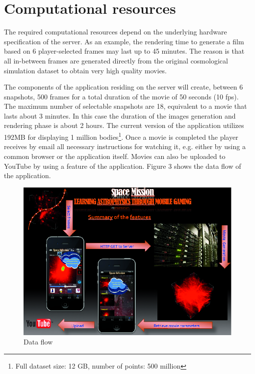 \documentclass[11pt,twoside]{article}
\begin{document}
\section{Computational resources}
The required computational resources depend on the underlying hardware specification of the server. As an example, the rendering time to generate a film based on 6 player-selected frames may last up to 45 minutes. The reason is that all in-between frames are generated directly from the original cosmological simulation dataset to obtain very high quality movies.\par
The components of the application residing on the server will  create, between  6 snapshots,
500 frames for a total duration of the movie of 50 seconds  (10 fps).
The maximum number of selectable snapshots are 18, equivalent  to a movie that lasts about 3 minutes. In this case the duration of the images generation and rendering phase is about  2 hours.
The current version of the application utilizes 192MB for displaying 1 million bodies\footnote{Full dataset size: 12 GB, number of points: 500 million}. Once a movie is completed the player receives by email all necessary instructions for watching it, e.g. either by using a common browser or the application itself. Movies can also be uploaded to YouTube by using a feature of the application.
Figure 3 shows the data flow of the application.\par
\begin{figure}[h]
\centering
\includegraphics[scale=0.9]{P024_f3}
\caption{Data flow}
\end{figure}
\end{document}
